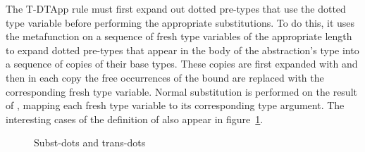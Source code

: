 \begin{schemeregion}
The {\sc T-DTApp} rule must first expand out dotted pre-types that use
the dotted type variable before performing the appropriate
substitutions.  To do this, it uses the metafunction \ttransdots{} on a
sequence of fresh type variables of the appropriate length to expand
dotted pre-types that appear in the body of the abstraction's type
into a sequence of copies of their base types.  These copies are first
expanded with \ttransdots{} and then in each copy the free occurrences
of the bound are replaced with the corresponding fresh type variable.
Normal substitution is performed on the result of \ttransdots{},
mapping each fresh type variable to its corresponding type argument.
The interesting cases of the definition of \ttransdots{} also appear in
figure~\ref{fig:metafuns}.

\begin{figure}[t]


\caption{Subst-dots and trans-dots\label{fig:metafuns}}
\end{figure}

\end{schemeregion}

